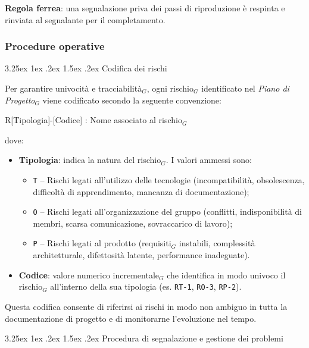 \documentclass[a4paper, 10pt]{article}
\makeatletter
\renewcommand\paragraph{\@startsection{paragraph}{4}{\z@}%
  {3.25ex \@plus1ex \@minus .2ex}%
  {1.5ex \@plus .2ex}%
  {\normalfont\normalsize\bfseries}}
\makeatother
\begin{document}
\noindent \textbf{Regola ferrea}: una segnalazione priva dei passi di riproduzione è respinta e rinviata al segnalante per il completamento.

\subsubsection{Procedure operative}
\label{subsubsec:procedure_risoluzione}

\paragraph{Codifica dei rischi}

Per garantire univocità e tracciabilità$_G$, ogni rischio$_G$ identificato nel \emph{Piano di Progetto}$_G$ viene codificato secondo la seguente convenzione:

R[Tipologia]-[Codice] : Nome associato al rischio$_G$

dove:
\begin{itemize}
    \item \textbf{Tipologia}: indica la natura del rischio$_G$. I valori ammessi sono:
    \begin{itemize}
        \item \texttt{T} – Rischi legati all'utilizzo delle tecnologie (incompatibilità, obsolescenza, difficoltà di apprendimento, mancanza di documentazione);
        \item \texttt{O} – Rischi legati all'organizzazione del gruppo (conflitti, indisponibilità di membri, scarsa comunicazione, sovraccarico di lavoro);
        \item \texttt{P} – Rischi legati al prodotto (requisiti$_G$ instabili, complessità architetturale, difettosità latente, performance inadeguate).
    \end{itemize}
    \item \textbf{Codice}: valore numerico incrementale$_G$ che identifica in modo univoco il rischio$_G$ all'interno della sua tipologia (es. \texttt{RT-1}, \texttt{RO-3}, \texttt{RP-2}).
\end{itemize}

Questa codifica consente di riferirsi ai rischi in modo non ambiguo in tutta la documentazione di progetto e di monitorarne l'evoluzione nel tempo.

\paragraph{Procedura di segnalazione e gestione dei problemi}
\end{document}

